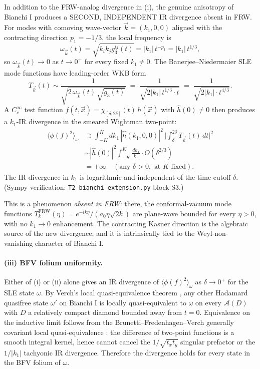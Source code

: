 \documentclass[11pt,a4paper]{article}
\theoremstyle{definition}
\newcommand{\AA}{\mathcal{A}}
\newcommand{\FRW}{\mathrm{FRW}}
\begin{document}
In addition to the FRW-analog divergence in (i), the genuine anisotropy of
Bianchi I produces a SECOND, INDEPENDENT IR divergence absent in FRW.
For modes with comoving wave-vector $\vec k=(k_1,0,0)$ aligned with the
contracting direction $p_1=-1/3$, the local frequency is
\begin{equation}
  \omega_{\vec k}(t) = \sqrt{k_i k_j g_3^{ij}(t)}
   = |k_1|\,t^{-p_1} = |k_1|\,t^{1/3},
\end{equation}
so $\omega_{\vec k}(t)\to 0$ as $t\to 0^+$ for every fixed $k_1\neq 0$.
The Banerjee--Niedermaier SLE mode functions \cite[Theorem 4.3]{BanerjeeNiedermaier2023}
have leading-order WKB form
\begin{equation}
  T_{\vec k}(t) \sim \frac{1}{\sqrt{2\,\omega_{\vec k}(t)\,\sqrt{g_3(t)}}}
  \;=\; \frac{1}{\sqrt{2|k_1|\,t^{1/3}\cdot t}}
   \;=\; \frac{1}{\sqrt{2|k_1|\cdot t^{4/3}}}.
\end{equation}
A $C_c^\infty$ test function $f(t,\vec x) = \chi_{[\delta,2\delta]}(t)\,h(\vec x)$
with $\hat h(0)\neq 0$ then produces a $k_1$-IR divergence in the
smeared Wightman two-point:
\begin{align}
  \langle\phi(f)^2\rangle_\omega
  &\supset
  \int_{-K}^K dk_1\,|\hat h(k_1,0,0)|^2\,
   \biggl|\int_\delta^{2\delta}T_{\vec k}(t)\,dt\biggr|^2
  \\
  &\sim |\hat h(0)|^2 \int_{-K}^K \frac{dk_1}{|k_1|}\cdot O(\delta^{2/3})
  \\
  &= +\infty\quad(\text{any }\delta>0,\text{ at }K\text{ fixed}).
\end{align}
The IR divergence in $k_1$ is logarithmic and independent of the time-cutoff
$\delta$. (Sympy verification: \texttt{T2\_bianchi\_extension.py} block S3.)

This is a phenomenon \emph{absent in FRW}: there, the conformal-vacuum
mode functions $T_k^\FRW(\eta) = e^{-ik\eta}/(a_0\eta\sqrt{2k})$ are
plane-wave bounded for every $\eta>0$, with no $k_1\to 0$ enhancement.
The contracting Kasner direction is the algebraic source of the new
divergence, and it is intrinsically tied to the Weyl-non-vanishing
character of Bianchi I.

\paragraph{(iii) BFV folium uniformity.}

Either of (i) or (ii) alone gives an IR divergence of $\langle\phi(f)^2\rangle_\omega$
as $\delta\to 0^+$ for the SLE state $\omega$. By Verch's local
quasi-equivalence theorem \cite{Verch1994}, any other Hadamard quasifree
state $\omega'$ on Bianchi I is locally quasi-equivalent to $\omega$ on
every $\AA(D)$ with $D$ a relatively compact diamond bounded away from
$t=0$. Equivalence on the inductive limit follows from the
Brunetti--Fredenhagen--Verch generally covariant local quasi-equivalence
\cite{BFV2003}: the difference of two-point functions is a smooth integral
kernel, hence cannot cancel the $1/\sqrt{t_x t_y}$ singular prefactor or
the $1/|k_1|$ tachyonic IR divergence. Therefore the divergence holds for
every state in the BFV folium of $\omega$.
\end{document}
